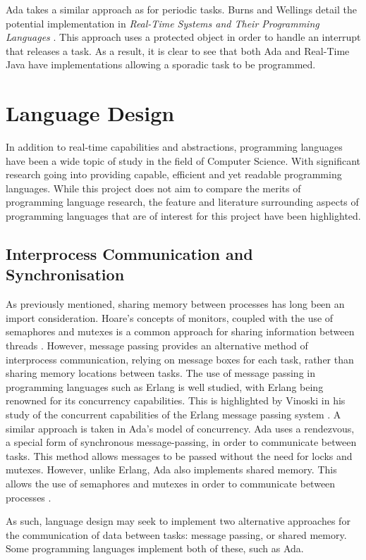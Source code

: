 \par\bigskip\noindent
Ada takes a similar approach as for periodic tasks. Burns
and Wellings detail the potential implementation in \emph{Real-Time Systems and
Their Programming Languages} \cite[p341]{real-time-systems}.  This approach
uses a protected object in order to handle an interrupt that releases a task.
As a result, it is clear to see that both Ada and Real-Time Java have
implementations allowing a sporadic task to be programmed. 

\section{Language Design} In addition to real-time capabilities and
abstractions, programming languages have been a wide topic of study in the
field of Computer Science. With significant research going into providing
capable, efficient and yet readable programming languages. While this project
does not aim to compare the merits of programming language research, the
feature and literature surrounding aspects of programming languages that are of
interest for this project have been highlighted. 

\subsection{Interprocess Communication and Synchronisation} %
As previously mentioned, sharing memory between processes has long been an import
consideration. Hoare's concepts of monitors, coupled with the use of semaphores
and mutexes is a common approach for sharing information between threads
\cite{Hoare:1974:MOS:355620.361161}.  However, message passing provides an
alternative method of interprocess communication, relying on message boxes for
each task, rather than sharing memory locations between tasks.  The use of
message passing in programming languages such as Erlang is well studied, with
Erlang being renowned for its concurrency capabilities. This is highlighted by
Vinoski in his study of the concurrent capabilities of the Erlang message
passing system \cite{6216341}. A similar approach is taken in Ada's model of
concurrency. Ada uses a rendezvous, a special form of synchronous
message-passing, in order to communicate between tasks. This method allows
messages to be passed without the need for locks and mutexes. However, unlike
Erlang, Ada also implements shared memory. This allows the use of semaphores
and mutexes in order to communicate between processes
\cite{burns1998concurrency}.  
\par\bigskip\noindent
As such, language design
may seek to implement two alternative approaches for the communication of data
between tasks: message passing, or shared memory. Some programming languages
implement both of these, such as Ada.


